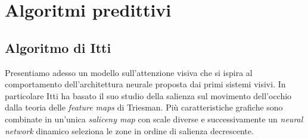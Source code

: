 \documentclass[%
	corpo=12pt,
    twoside,
    stile=classica,
    oldstyle,
    tipotesi=custom,
    greek,
    evenboxes,
]{toptesi}
\begin{document}
{%

%
%
%
%




\chapter{Algoritmi predittivi}

\section{Algoritmo di Itti}

Presentiamo adesso un modello sull'attenzione visiva che si ispira al comportamento dell'architettura neurale proposta dai primi sistemi visivi. In particolare Itti ha basato il suo studio della salienza sul movimento dell'occhio dalla teoria delle \textit{feature maps} di Triesman. Più caratteristiche grafiche sono combinate in un'unica \textit{saliceny map} con scale diverse e successivamente un \textit{neural network} dinamico seleziona le zone in ordine di salienza decrescente. 

}
\end{document}
